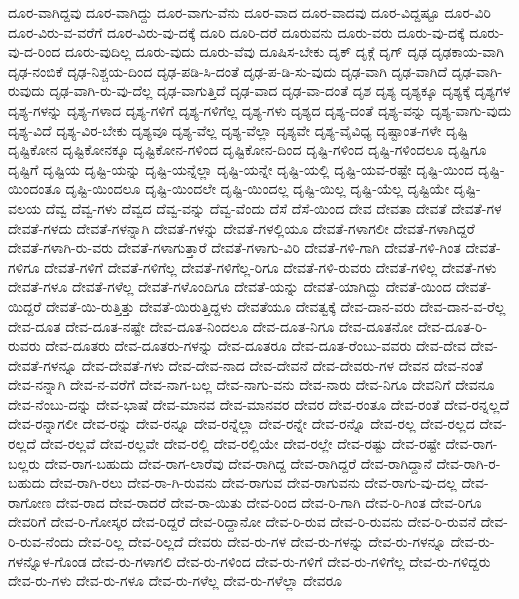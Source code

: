 {ದೂರ-ವಾಗಿದ್ದವು
ದೂರ-ವಾಗಿದ್ದು
ದೂರ-ವಾಗು-ವೆನು
ದೂರ-ವಾದ
ದೂರ-ವಾದವು
ದೂರ-ವಿದ್ದಷ್ಟೂ
ದೂರ-ವಿರಿ
ದೂರ-ವಿರು-ವ-ವರೆಗೆ
ದೂರ-ವಿರು-ವು-ದಕ್ಕೆ
ದೂರಿ
ದೂರಿ-ದರೆ
ದೂರುವನು
ದೂರು-ವರು
ದೂರು-ವು-ದಕ್ಕೆ
ದೂರು-ವು-ದ-ರಿಂದ
ದೂರು-ವುದಿಲ್ಲ
ದೂರು-ವುದು
ದೂರು-ವೆವು
ದೂಷಿಸ-ಬೇಕು
ದೃಕ್
ದೃಕ್ಗೆ
ದೃಗ್
ದೃಢ
ದೃಢಕಾಯ-ವಾಗಿ
ದೃಢ-ನಂಬಿಕೆ
ದೃಢ-ನಿಶ್ಚಯ-ದಿಂದ
ದೃಢ-ಪಡಿ-ಸಿ-ದಂತೆ
ದೃಢ-ಪ-ಡಿ-ಸು-ವುದು
ದೃಢ-ವಾಗಿ
ದೃಢ-ವಾಗಿದೆ
ದೃಢ-ವಾಗಿ-ರುವುದು
ದೃಢ-ವಾಗಿ-ರು-ವು-ದೆಲ್ಲ
ದೃಢ-ವಾಗುತ್ತಿದೆ
ದೃಢ-ವಾದ
ದೃಢ-ವಾ-ದಂತೆ
ದೃಶ
ದೃಶ್ಯ
ದೃಶ್ಯಕ್ಕೂ
ದೃಶ್ಯಕ್ಕೆ
ದೃಶ್ಯಗಳ
ದೃಶ್ಯ-ಗಳನ್ನು
ದೃಶ್ಯ-ಗಳಾದ
ದೃಶ್ಯ-ಗಳಿಗೆ
ದೃಶ್ಯ-ಗಳಿಗೆಲ್ಲ
ದೃಶ್ಯ-ಗಳು
ದೃಶ್ಯದ
ದೃಶ್ಯ-ದಂತೆ
ದೃಶ್ಯ-ವನ್ನು
ದೃಶ್ಯ-ವಾಗು-ವುದು
ದೃಶ್ಯ-ವಿದೆ
ದೃಶ್ಯ-ವಿರ-ಬೇಕು
ದೃಶ್ಯವೂ
ದೃಶ್ಯ-ವೆಲ್ಲ
ದೃಶ್ಯ-ವೆಲ್ಲಾ
ದೃಶ್ಯವೇ
ದೃಶ್ಯ-ವೈವಿಧ್ಯ
ದೃಷ್ಟಾಂತ-ಗಳೇ
ದೃಷ್ಟಿ
ದೃಷ್ಟಿಕೋನ
ದೃಷ್ಟಿಕೋನಕ್ಕೂ
ದೃಷ್ಟಿಕೋನ-ಗಳಿಂದ
ದೃಷ್ಟಿಕೋನ-ದಿಂದ
ದೃಷ್ಟಿ-ಗಳಿಂದ
ದೃಷ್ಟಿ-ಗಳಿಂದಲೂ
ದೃಷ್ಟಿಗೂ
ದೃಷ್ಟಿಗೆ
ದೃಷ್ಟಿಯ
ದೃಷ್ಟಿ-ಯನ್ನು
ದೃಷ್ಟಿ-ಯನ್ನೆಲ್ಲಾ
ದೃಷ್ಟಿ-ಯನ್ನೇ
ದೃಷ್ಟಿ-ಯಲ್ಲಿ
ದೃಷ್ಟಿ-ಯವ-ರಷ್ಟೇ
ದೃಷ್ಟಿ-ಯಿಂದ
ದೃಷ್ಟಿ-ಯಿಂದಂತೂ
ದೃಷ್ಟಿ-ಯಿಂದಲೂ
ದೃಷ್ಟಿ-ಯಿಂದಲೇ
ದೃಷ್ಟಿ-ಯಿಂದಲ್ಲ
ದೃಷ್ಟಿ-ಯಿಲ್ಲ
ದೃಷ್ಟಿ-ಯೆಲ್ಲ
ದೃಷ್ಟಿಯೇ
ದೃಷ್ಟಿ-ವಲಯ
ದೆವ್ವ
ದೆವ್ವ-ಗಳು
ದೆವ್ವದ
ದೆವ್ವ-ವನ್ನು
ದೆವ್ವ-ವೆಂದು
ದೆಸೆ
ದೆಸೆ-ಯಿಂದ
ದೇವ
ದೇವತಾ
ದೇವತೆ
ದೇವತೆ-ಗಳ
ದೇವತೆ-ಗಳದು
ದೇವತೆ-ಗಳನ್ನಾಗಿ
ದೇವತೆ-ಗಳನ್ನು
ದೇವತೆ-ಗಳಲ್ಲಿಯೂ
ದೇವತೆ-ಗಳಾಗಲೀ
ದೇವತೆ-ಗಳಾಗಿದ್ದರೆ
ದೇವತೆ-ಗಳಾಗಿ-ರು-ವರು
ದೇವತೆ-ಗಳಾಗುತ್ತಾರೆ
ದೇವತೆ-ಗಳಾಗು-ವಿರಿ
ದೇವತೆ-ಗಳಿ-ಗಾಗಿ
ದೇವತೆ-ಗಳಿ-ಗಿಂತ
ದೇವತೆ-ಗಳಿಗೂ
ದೇವತೆ-ಗಳಿಗೆ
ದೇವತೆ-ಗಳಿಗೆಲ್ಲ
ದೇವತೆ-ಗಳಿಗೆಲ್ಲ-ರಿಗೂ
ದೇವತೆ-ಗಳಿ-ರುವರು
ದೇವತೆ-ಗಳಿಲ್ಲ
ದೇವತೆ-ಗಳು
ದೇವತೆ-ಗಳೂ
ದೇವತೆ-ಗಳೆಲ್ಲ
ದೇವತೆ-ಗಳೊಂದಿಗೂ
ದೇವತೆ-ಯನ್ನು
ದೇವತೆ-ಯಾಗಿದ್ದು
ದೇವತೆ-ಯಿಂದ
ದೇವತೆ-ಯಿದ್ದರೆ
ದೇವತೆ-ಯಿ-ರುತ್ತಿತ್ತು
ದೇವತೆ-ಯಿರುತ್ತಿದ್ದಳು
ದೇವತೆಯೂ
ದೇವತ್ವಕ್ಕೆ
ದೇವ-ದಾನ-ವರು
ದೇವ-ದಾನ-ವ-ರೆಲ್ಲ
ದೇವ-ದೂತ
ದೇವ-ದೂತ-ನಷ್ಟೇ
ದೇವ-ದೂತ-ನಿಂದಲೂ
ದೇವ-ದೂತ-ನಿಗೂ
ದೇವ-ದೂತನೋ
ದೇವ-ದೂತ-ರಿ-ರುವರು
ದೇವ-ದೂತರು
ದೇವ-ದೂತರು-ಗಳನ್ನು
ದೇವ-ದೂತರೂ
ದೇವ-ದೂತ-ರೆಂಬು-ವವರು
ದೇವ-ದೇವ
ದೇವ-ದೇವತೆ-ಗಳನ್ನೂ
ದೇವ-ದೇವತೆ-ಗಳು
ದೇವ-ದೇವ-ನಾದ
ದೇವ-ದೇವನೆ
ದೇವ-ದೇವರು-ಗಳ
ದೇವನ
ದೇವ-ನಂತೆ
ದೇವ-ನನ್ನಾಗಿ
ದೇವ-ನ-ವರೆಗೆ
ದೇವ-ನಾಗ-ಬಲ್ಲ
ದೇವ-ನಾಗು-ವನು
ದೇವ-ನಾರು
ದೇವ-ನಿಗೂ
ದೇವನಿಗೆ
ದೇವನೂ
ದೇವ-ನೆಂಬು-ದನ್ನು
ದೇವ-ಭಾಷೆ
ದೇವ-ಮಾನವ
ದೇವ-ಮಾನವರ
ದೇವರ
ದೇವ-ರಂತೂ
ದೇವ-ರಂತೆ
ದೇವ-ರನ್ನಲ್ಲದೆ
ದೇವ-ರನ್ನಾಗಲೀ
ದೇವ-ರನ್ನು
ದೇವ-ರನ್ನೂ
ದೇವ-ರನ್ನೆಲ್ಲಾ
ದೇವ-ರನ್ನೇ
ದೇವ-ರನ್ನೊ
ದೇವ-ರಲ್ಲ
ದೇವ-ರಲ್ಲದ
ದೇವ-ರಲ್ಲದೆ
ದೇವ-ರಲ್ಲವೆ
ದೇವ-ರಲ್ಲವೇ
ದೇವ-ರಲ್ಲಿ
ದೇವ-ರಲ್ಲಿಯೇ
ದೇವ-ರಲ್ಲೇ
ದೇವ-ರಷ್ಟು
ದೇವ-ರಷ್ಟೇ
ದೇವ-ರಾಗ-ಬಲ್ಲರು
ದೇವ-ರಾಗ-ಬಹುದು
ದೇವ-ರಾಗ-ಲಾರೆವು
ದೇವ-ರಾಗಿದ್ದ
ದೇವ-ರಾಗಿದ್ದರೆ
ದೇವ-ರಾಗಿದ್ದಾನೆ
ದೇವ-ರಾಗಿ-ರ-ಬಹುದು
ದೇವ-ರಾಗಿ-ರಲು
ದೇವ-ರಾ-ಗಿ-ರುವನು
ದೇವ-ರಾಗುವ
ದೇವ-ರಾಗುವನು
ದೇವ-ರಾಗು-ವು-ದಲ್ಲ
ದೇವ-ರಾಗೋಣ
ದೇವ-ರಾದ
ದೇವ-ರಾದರೆ
ದೇವ-ರಾ-ಯಿತು
ದೇವ-ರಿಂದ
ದೇವ-ರಿ-ಗಾಗಿ
ದೇವ-ರಿ-ಗಿಂತ
ದೇವ-ರಿಗೂ
ದೇವರಿಗೆ
ದೇವ-ರಿ-ಗೋಸ್ಕರ
ದೇವ-ರಿದ್ದರೆ
ದೇವ-ರಿದ್ದಾನೋ
ದೇವ-ರಿ-ರುವ
ದೇವ-ರಿ-ರುವನು
ದೇವ-ರಿ-ರುವನೆ
ದೇವ-ರಿ-ರುವ-ನೆಂದು
ದೇವ-ರಿಲ್ಲ
ದೇವ-ರಿಲ್ಲದೆ
ದೇವರು
ದೇವ-ರು-ಗಳ
ದೇವ-ರು-ಗಳನ್ನು
ದೇವ-ರು-ಗಳನ್ನೂ
ದೇವ-ರು-ಗಳನ್ನೊಳ-ಗೊಂಡ
ದೇವ-ರು-ಗಳಾಗಲಿ
ದೇವ-ರು-ಗಳಿಂದ
ದೇವ-ರು-ಗಳಿಗೆ
ದೇವ-ರು-ಗಳಿಗೆಲ್ಲ
ದೇವ-ರು-ಗಳಿದ್ದರು
ದೇವ-ರು-ಗಳು
ದೇವ-ರು-ಗಳೂ
ದೇವ-ರು-ಗಳೆಲ್ಲ
ದೇವ-ರು-ಗಳೆಲ್ಲಾ
ದೇವರೂ
}
